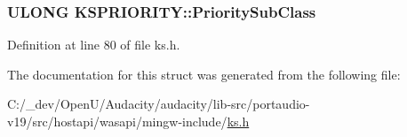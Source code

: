 \subsubsection[{\texorpdfstring{Priority\+Sub\+Class}{PrioritySubClass}}]{\setlength{\rightskip}{0pt plus 5cm}U\+L\+O\+NG K\+S\+P\+R\+I\+O\+R\+I\+T\+Y\+::\+Priority\+Sub\+Class}\hypertarget{struct_k_s_p_r_i_o_r_i_t_y_afa60e98100c79a97dd08096c2db0df76}{}\label{struct_k_s_p_r_i_o_r_i_t_y_afa60e98100c79a97dd08096c2db0df76}


Definition at line 80 of file ks.\+h.



The documentation for this struct was generated from the following file\+:\begin{DoxyCompactItemize}
\item 
C\+:/\+\_\+dev/\+Open\+U/\+Audacity/audacity/lib-\/src/portaudio-\/v19/src/hostapi/wasapi/mingw-\/include/\hyperlink{ks_8h}{ks.\+h}\end{DoxyCompactItemize}
